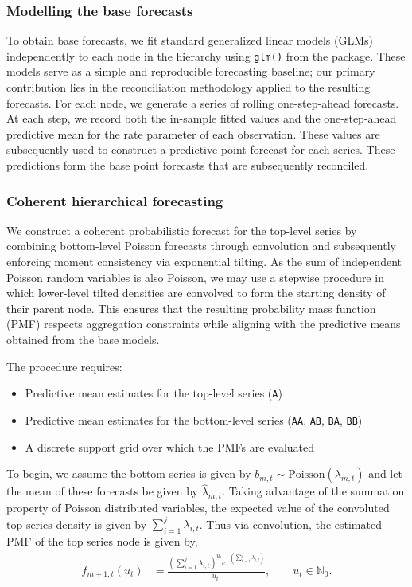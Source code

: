 \subsubsection{Modelling the base forecasts}\label{modelling-the-base-forecasts}

To obtain base forecasts, we fit standard generalized linear models (GLMs) independently to each node in the hierarchy using \texttt{glm()} from the  package. These models serve as a simple and reproducible forecasting baseline; our primary contribution lies in the reconciliation methodology applied to the resulting forecasts. For each node, we generate a series of rolling one-step-ahead forecasts. At each step, we record both the in-sample fitted values and the one-step-ahead predictive mean for the rate parameter of each observation. These values are subsequently used to construct a predictive point forecast for each series. These predictions form the base point forecasts that are subsequently reconciled.

\subsubsection{Coherent hierarchical forecasting}\label{coherent-hierarchical-forecasting}

We construct a coherent probabilistic forecast for the top-level series by combining bottom-level Poisson forecasts through convolution and subsequently enforcing moment consistency via exponential tilting. As the sum of independent Poisson random variables is also Poisson, we may use a stepwise procedure in which lower-level tilted densities are convolved to form the starting density of their parent node. This ensures that the resulting probability mass function (PMF) respects aggregation constraints while aligning with the predictive means obtained from the base models.

The procedure requires:

\begin{itemize}
\tightlist
\item
  Predictive mean estimates for the top-level series (\texttt{A})
\item
  Predictive mean estimates for the bottom-level series (\texttt{AA}, \texttt{AB}, \texttt{BA}, \texttt{BB})
\item
  A discrete support grid over which the PMFs are evaluated
\end{itemize}

To begin, we assume the bottom series is given by \(b_{m, t} \sim \mathrm{Poisson}(\lambda_{m,t})\) and let the mean of these forecasts be given by \(\hat{\lambda}_{m,t}\). Taking advantage of the summation property of Poisson distributed variables, the expected value of the convoluted top series density is given by \(\sum_{i=1}^{j}\lambda_{i,t}\). Thus via convolution, the estimated PMF of the top series node is given by,
\begin{align}
    f_{m+1,t}(u_{t}) &=
    \frac{ (\sum_{i=1}^{j}\lambda_{i,t})^{u_{t}} e^{-(\sum_{i=1}^{j}\lambda_{i,t})}}{u_{t}!},
    \qquad u_{t} \in \mathbb{N}_0.
\end{align}

